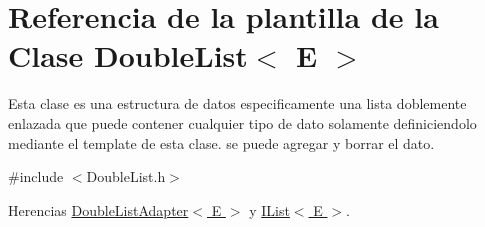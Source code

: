 \hypertarget{classDoubleList}{\section{Referencia de la plantilla de la Clase Double\-List$<$ E $>$}
\label{classDoubleList}
}


Esta clase es una estructura de datos especificamente una lista doblemente enlazada que puede contener cualquier tipo de dato solamente definiciendolo mediante el template de esta clase. se puede agregar y borrar el dato.  




{\ttfamily \#include $<$Double\-List.\-h$>$}



Herencias \hyperlink{classDoubleListAdapter}{Double\-List\-Adapter$<$ E $>$} y \hyperlink{classIList}{I\-List$<$ E $>$}.

